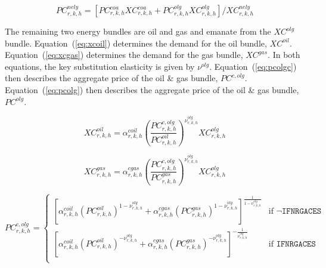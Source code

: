 \documentclass[11pt,letterpaper]{report}
\begin{document}
\begin{equation}
\label{eq:pcnely}
\mathit{PC}^{\mathit{nely}}_{r,k,h} =
\left[
\mathit{PC}^{\mathit{coa}}_{r,k,h} \mathit{XC}^{\mathit{coa}}_{r,k,h}
+ \mathit{PC}^{\mathit{olg}}_{r,k,h} \mathit{XC}^{\mathit{olg}}_{r,k,h}
\right]
\bigg / \mathit{XC}^{\mathit{nely}}_{r,k,h}
\end{equation}

The remaining two energy bundles are oil and gas and emanate from the
$\mathit{XC}^{\mathit{olg}}$ bundle. Equation~(\ref{eq:xcoil}) determines the
demand for the oil bundle, $\mathit{XC}^{\mathit{oil}}$.
Equation~(\ref{eq:xcgas}) determines the demand for the gas bundle,
$\mathit{XC}^{\mathit{gas}}$. In both equations, the key substitution elasticity
is given by $\nu^{\mathit{olg}}$.
Equation~(\ref{eq:pcolgc}) then describes the
aggregate price of the oil \& gas bundle, $\mathit{PC}^{c,\mathit{olg}}$.
Equation~(\ref{eq:pcolg}) then describes the
aggregate price of the oil \& gas bundle, $\mathit{PC}^{\mathit{olg}}$.

\begin{equation}
\label{eq:xcoil}
\mathit{XC}^{\mathit{oil}}_{r,k,h} =
   \alpha^{\mathit{coil}}_{\mathit{r,k,h}}
   \left( \frac {\mathit{PC}^{c,\mathit{olg}}_{r,k,h}}
      {\mathit{PC}^{\mathit{oil}}_{r,k,h}}
   \right)^{\nu^{\mathit{olg}}_{\mathit{r,k,h}}}
   \mathit{XC}^{\mathit{olg}}_{r,k,h}
\end{equation}

\begin{equation}
\label{eq:xcgas}
\mathit{XC}^{\mathit{gas}}_{r,k,h} =
   \alpha^{\mathit{cgas}}_{\mathit{r,k,h}}
   \left( \frac {\mathit{PC}^{c,\mathit{olg}}_{r,k,h}}
      {\mathit{PC}^{\mathit{gas}}_{r,k,h}}
   \right)^{\nu^{\mathit{olg}}_{\mathit{r,k,h}}}
   \mathit{XC}^{\mathit{olg}}_{r,k,h}
\end{equation}

\begin{equation}
\label{eq:pcolgc}
\mathit{PC}^{c,\mathit{olg}}_{r,k,h} =
\begin{cases}
  \left[
        \alpha^{\mathit{coil}}_{\mathit{r,k,h}}
        \left( \mathit{PC}^{\mathit{oil}}_{r,k,h}
        \right)^{1 - \nu^{\mathit{olg}}_{\mathit{r,k,h}}}
     +  \alpha^{\mathit{cgas}}_{\mathit{r,k,h}}
        \left( \mathit{PC}^{\mathit{gas}}_{r,k,h}
        \right)^{1 - \nu^{\mathit{olg}}_{\mathit{r,k,h}}}
     \right]^{\frac{1} {1 - \nu^{\mathit{olg}}_{\mathit{r,k,h}}}} &
   \textrm{if } \lnot \texttt{IFNRGACES} \\
   \left[
         \alpha^{\mathit{coil}}_{\mathit{r,k,h}}
         \left( \mathit{PC}^{\mathit{oil}}_{r,k,h}
         \right)^{- \nu^{\mathit{olg}}_{\mathit{r,k,h}}}
      +  \alpha^{\mathit{cgas}}_{\mathit{r,k,h}}
         \left( \mathit{PC}^{\mathit{gas}}_{r,k,h}
         \right)^{- \nu^{\mathit{olg}}_{\mathit{r,k,h}}}
      \right]^{-\frac{1} {\nu^{\mathit{olg}}_{\mathit{r,k,h}}}} &
   \textrm{if } \texttt{IFNRGACES} \\
\end{cases}
\end{equation}
\end{document}
